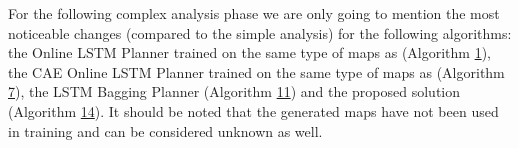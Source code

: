 For the following complex analysis phase we are only going to mention the most noticeable changes (compared to the simple analysis) for the following algorithms: the Online LSTM Planner trained on the same type of maps as \cite{nicola2018lstm} (Algorithm \hyperref[tab: evalalgorithms]{1}), the CAE Online LSTM Planner trained on the same type of maps as \cite{inoue2019robot} (Algorithm \hyperref[tab: evalalgorithms]{7}), the LSTM Bagging Planner (Algorithm \hyperref[tab: evalalgorithms]{11}) and the proposed solution (Algorithm \hyperref[tab: evalalgorithms]{14}). It should be noted that the generated maps have not been used in training and can be considered unknown as well.

\newpage